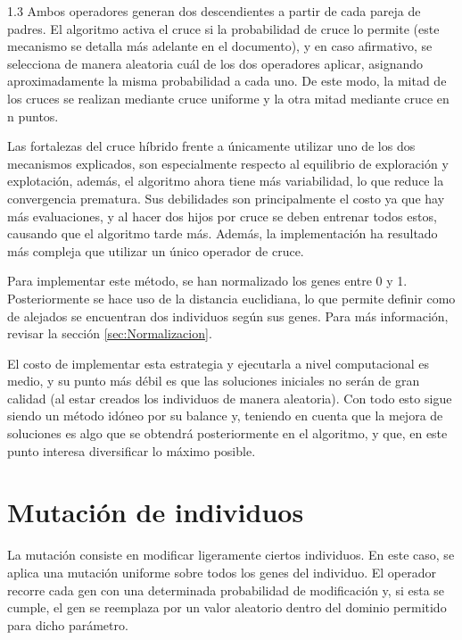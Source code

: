 \documentclass{article}
\begin{document}
\begin{spacing}{1.3}
Ambos operadores generan dos descendientes a partir de cada pareja de padres.\newline
El algoritmo activa el cruce si la probabilidad de cruce lo permite (este mecanismo se detalla más adelante en el documento), y en caso afirmativo, 
se selecciona de manera aleatoria cuál de los dos operadores aplicar, asignando aproximadamente la misma probabilidad a cada uno. De este modo, 
la mitad de los cruces se realizan mediante cruce uniforme y la otra mitad mediante cruce en n puntos.\newline

Las fortalezas del cruce híbrido frente a únicamente utilizar uno de los dos mecanismos explicados, son especialmente respecto
al equilibrio de exploración y explotación, además, el algoritmo ahora tiene más variabilidad, lo que reduce la convergencia prematura.
Sus debilidades son principalmente el costo ya que hay más evaluaciones, y al hacer dos hijos por cruce se deben entrenar todos estos, causando
que el algoritmo tarde más. Además, la implementación ha resultado más compleja que utilizar un único operador de cruce.

Para implementar este método, se han normalizado los genes entre 0 y 1. Posteriormente se hace uso de la distancia euclidiana,
lo que permite definir como de alejados se encuentran dos individuos según sus genes. Para más información, revisar
la sección \ref{sec:Normalizacion}. \newline

El costo de implementar esta estrategia y ejecutarla a nivel computacional
es medio, y su punto más débil es que las soluciones iniciales no serán de gran calidad (al estar creados los individuos de manera aleatoria). Con todo esto
sigue siendo un método idóneo por su balance y, teniendo en cuenta que la mejora de soluciones es algo que se obtendrá posteriormente en el algoritmo,
y que, en este punto interesa diversificar lo máximo posible.


\section{Mutación de individuos}

La mutación consiste en modificar ligeramente ciertos individuos. 
En este caso, se aplica una mutación uniforme sobre todos los genes del individuo. 
El operador recorre cada gen con una determinada probabilidad de modificación y,
 si esta se cumple, el gen se reemplaza por un valor aleatorio dentro del dominio 
 permitido para dicho parámetro. 


\end{spacing}
\end{document}
